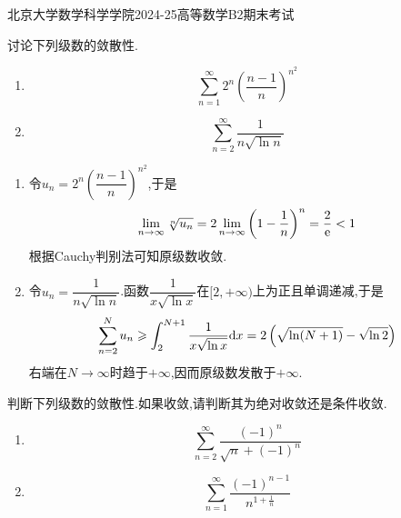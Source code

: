 \documentclass{ctexart}
\begin{document}
\pagestyle{empty}
\begin{center}\Large
    北京大学数学科学学院2024-25高等数学B2期末考试
\end{center}
\begin{problem}[1.(14\songti{分})]
    讨论下列级数的敛散性.
    \begin{enumerate}[label=\tbf{(\arabic*)},topsep=0pt,parsep=0pt,itemsep=0pt,partopsep=0pt]
        \item \[\sum_{n=1}^{\infty}2^n\left(\dfrac{n-1}{n}\right)^{n^2}\]
        \item \[\sum_{n=2}^{\infty}\dfrac{1}{n\sqrt{\ln n}}\]
    \end{enumerate}

\end{problem}
\begin{solution}
    \begin{enumerate}[label=\tbf{(\arabic*)},topsep=0pt,parsep=0pt,itemsep=0pt,partopsep=0pt]
        \item 令$u_n=2^n\left(\dfrac{n-1}{n}\right)^{n^2}$,于是
            \[\lim_{n\to\infty}\sqrt[n]{u_n}=2\lim_{n\to\infty}\left(1-\dfrac1n\right)^n=\dfrac{2}{\mathrm{e}}<1\]
            根据Cauchy判别法可知原级数收敛.
        \item 令$u_n=\dfrac{1}{n\sqrt{\ln n}}$.函数$\dfrac{1}{x\sqrt{\ln x}}$在$[2,+\infty)$上为正且单调递减,于是
            \[\sum_{n=2}^{N}u_n\geqslant\int_2^{N+1}\dfrac{1}{x\sqrt{\ln x}}\mathrm{d} x
            =2\left(\sqrt{\ln(N+1)}-\sqrt{\ln2}\right)\]
            右端在$N\to\infty$时趋于$+\infty$,因而原级数发散于$+\infty$.
    \end{enumerate}
\end{solution}
\begin{problem}[2.(14\songti{分})]
    判断下列级数的敛散性.如果收敛,请判断其为绝对收敛还是条件收敛.
    \begin{enumerate}[label=\tbf{(\arabic*)},topsep=0pt,parsep=0pt,itemsep=0pt,partopsep=0pt]
        \item \[\sum_{n=2}^{\infty}\dfrac{(-1)^n}{\sqrt{n}+(-1)^n}\]
        \item \[\sum_{n=1}^{\infty}\dfrac{(-1)^{n-1}}{n^{1+\frac1n}}\]
    \end{enumerate}

\end{problem}
\end{document}
